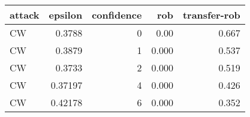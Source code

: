 \begin{tabular}{lrrrr}
\toprule
attack & epsilon & confidence & rob & transfer-rob \\
\midrule
CW & 0.3788 & 0 & 0.00 & 0.667 \\
CW & 0.3879 & 1 & 0.000 & 0.537 \\
CW & 0.3733 & 2 & 0.000 & 0.519 \\
CW & 0.37197 & 4 & 0.000 & 0.426 \\
CW & 0.42178 & 6 & 0.000 & 0.352 \\
\bottomrule
\end{tabular}
